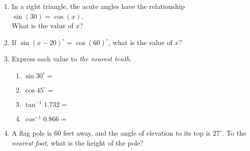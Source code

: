 \documentclass[12pt, twoside]{article}
\begin{document}
\begin{enumerate}
   \item In a right triangle, the acute angles have the relationship $\sin (30)=\cos(x)$.\\[0.25cm]
     What is the value of $x$? \vspace{3cm}

   \item If $\sin (x-20)^\circ = \cos(60)^\circ$, what is the value of $x$? \vspace{5cm}

   \item Express each value to \emph{the nearest tenth}.  \vspace{0.5cm}
     \begin{multicols}{2}
       \begin{enumerate}
         \item $\sin 30^\circ = $ \vspace{1cm}
         \item $\cos 45^\circ =$
         \item $\tan^{-1} 1.732 = $ \vspace{1cm}
         \item $\cos^{-1} 0.866 =$
       \end{enumerate}
     \end{multicols}

 \newpage

   \item A flag pole is 60 feet away, and the angle of elevation to its top is $27^\circ$. To the \emph{nearest foot}, what is the height of the pole?\\
     \vspace{4cm}


\end{enumerate}
\end{document}
